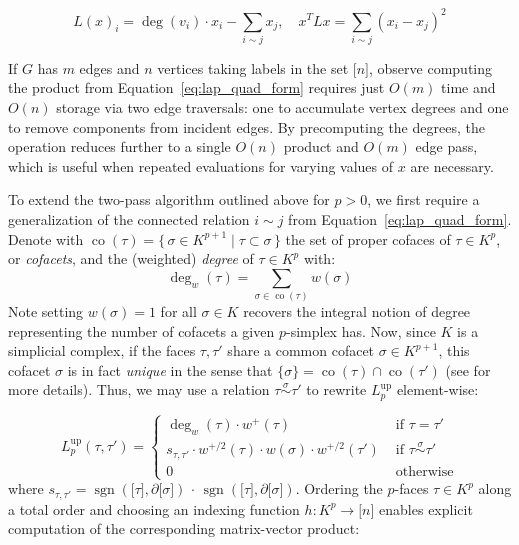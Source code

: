 \documentclass[pdflatex,sn-mathphys-num]{sn-jnl}
\begin{document}
\begin{appendices}
\[{L(x)}_{i} = \deg(v_{i}) \cdot x_{i} - \sum_{i \sim j}x_{j},\quad x^{T}Lx = \sum_{i \sim j}\left( x_{i} - x_{j} \right)^{2}\] \label{eq:lap_quad_form}{}

\noindent If \(G\) has \(m\) edges and \(n\) vertices taking labels in the set \(\left. \lbrack n\rbrack \right.\), observe computing the product from Equation~\ref{eq:lap_quad_form} requires just \(O(m)\) time and \(O(n)\) storage via two edge traversals: one to accumulate vertex degrees and one to remove components from incident edges. By precomputing the degrees, the operation reduces further to a single \(O(n)\) product and \(O(m)\) edge pass, which is useful when repeated evaluations for varying values of \(x\) are necessary.

To extend the two-pass algorithm outlined above for \(p > 0\), we first require a generalization of the connected relation \(i \sim j\) from Equation~\ref{eq:lap_quad_form}. Denote with \(\operatorname{co}(\tau) = \{\,\sigma \in K^{p + 1} \mid \tau \subset \sigma\,\}\) the set of proper cofaces of \(\tau \in K^{p}\), or \emph{cofacets}, and the (weighted) \emph{degree} of \(\tau \in K^{p}\) with: \[\deg_{w}(\tau) = \sum_{\sigma \in \operatorname{co}(\tau)}w(\sigma)\] Note setting \(w(\sigma) = 1\) for all \(\sigma \in K\) recovers the integral notion of degree representing the number of cofacets a given \(p\)-simplex has. Now, since \(K\) is a simplicial complex, if the faces \(\tau,\tau'\) share a common cofacet \(\sigma \in K^{p + 1}\), this cofacet \(\sigma\) is in fact \emph{unique} in the sense that \(\{\sigma\} = \operatorname{co}(\tau) \cap \operatorname{co}(\tau')\) (see \cite{goldberg2002combinatorial} for more details). Thus, we may use a relation \(\tau\overset{\sigma}{\sim}\tau'\) to rewrite \(L_{p}^{\operatorname{up}}\) element-wise:

\[L_{p}^{\operatorname{up}}(\tau,\tau') = \begin{cases}
\deg_{w}(\tau) \cdot w^{+}(\tau) & \text{ if }\tau = \tau' \\
s_{\tau,\tau'} \cdot w^{+ /2}(\tau) \cdot w(\sigma) \cdot w^{+ /2}(\tau') & \text{ if }\tau\overset{\sigma}{\sim}\tau' \\
0 & \text{ otherwise}
\end{cases}
\]
\noindent where \(s_{\tau,\tau'} = \operatorname{sgn}\left. \left( \left. \lbrack\tau\rbrack \right.,\partial\left. \lbrack\sigma\rbrack \right. \right) \right.\, \cdot \,\operatorname{sgn}\left. \left( \left. \lbrack\tau\rbrack \right.,\partial\left. \lbrack\sigma\rbrack \right. \right) \right.\). Ordering the \(p\)-faces \(\tau \in K^{p}\) along a total order and choosing an indexing function \(h:K^{p} \rightarrow \left. \lbrack n\rbrack \right.\) enables explicit computation of the corresponding matrix-vector product:


\end{appendices}
\end{document}
